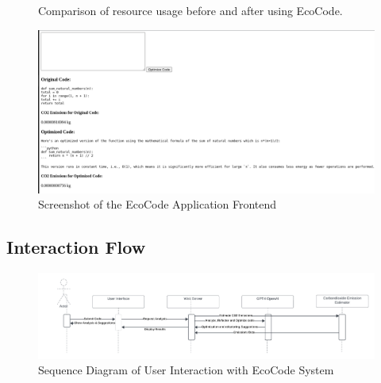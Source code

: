 \documentclass[conference,compsoc]{IEEEtran}
\begin{document}
    \begin{figure}[H]
        \centering
        \caption{Comparison of resource usage before and after using EcoCode.}
        \label{fig:resource_usage}
        \end{figure}


\begin{figure}[H]
\centering
\includegraphics[width=\linewidth]{figures/Frontend.png}
\caption{Screenshot of the EcoCode Application Frontend}
\label{fig:frontend_screenshot}
\end{figure}

\subsection{Interaction Flow}
\begin{figure}[H]
\centering
\includegraphics[width=\linewidth]{figures/Sequence Diagram.png}
\caption{Sequence Diagram of User Interaction with EcoCode System}
\label{fig:sequence_diagram}
\end{figure}
\end{document}
